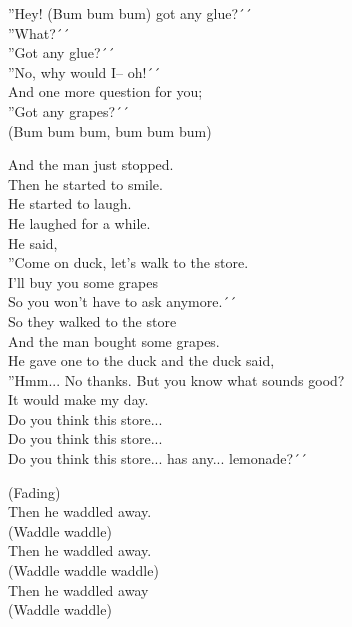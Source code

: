 ''Hey! (Bum bum bum) got any glue?´´\\
''What?´´\\
''Got any glue?´´\\
''No, why would I– oh!´´\\
And one more question for you;\\
''Got any grapes?´´\\
(Bum bum bum, bum bum bum)\par
\vspace{10pt}
And the man just stopped.\\
Then he started to smile.\\
He started to laugh.\\
He laughed for a while.\\
He said,\\
''Come on duck, let’s walk to the store.\\
I’ll buy you some grapes\\
So you won't have to ask anymore.´´\\
So they walked to the store\\
And the man bought some grapes.\\
He gave one to the duck and the duck said,\\
''Hmm... No thanks. But you know what sounds good?\\
It would make my day.\\
Do you think this store...\\
Do you think this store...\\
Do you think this store... has any... lemonade?´´\par
\vspace{10pt}
(Fading)\\
Then he waddled away.\\
(Waddle waddle)\\
Then he waddled away.\\
(Waddle waddle waddle)\\
Then he waddled away\\
(Waddle waddle)
